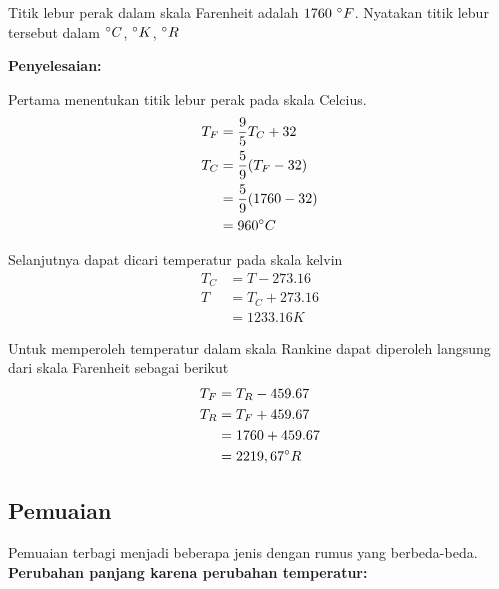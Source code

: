 \documentclass[twocolumn, 11pt]{article}%
\begin{document}
        Titik lebur perak dalam skala Farenheit adalah $1760\ \degree F$. Nyatakan titik lebur tersebut dalam $\degree C$, $\degree K$, $\degree R$

        \textbf{Penyelesaian:}

        Pertama menentukan titik lebur perak pada skala Celcius.
        \begin{equation*}
            \begin{split}
                T_F &= \frac{9}{5} T_C + 32\\
                T_C &= \frac{5}{9} (T_F - 32)\\
                &= \frac{5}{9} (1760 - 32)\\
                &= 960\degree C
            \end{split}
        \end{equation*}

        Selanjutnya dapat dicari temperatur pada skala kelvin
        \begin{equation*}
            \begin{split}
                T_C &=T - 273.16\\
                T &= T_C + 273.16\\
                &= 1233.16 K
            \end{split}
        \end{equation*}

        Untuk memperoleh temperatur dalam skala Rankine dapat diperoleh langsung dari skala Farenheit sebagai berikut
        \begin{equation*}
            \begin{split}
                T_F &=T_R - 459.67\\
                T_R &= T_F + 459.67\\
                &= 1760 + 459.67\\
                &= 2219,67 \degree R
            \end{split}
        \end{equation*}

        \subsection{Pemuaian}
        Pemuaian terbagi menjadi beberapa jenis dengan rumus yang berbeda-beda.\\
        
        \textbf{Perubahan panjang karena perubahan temperatur:}
\end{document}
